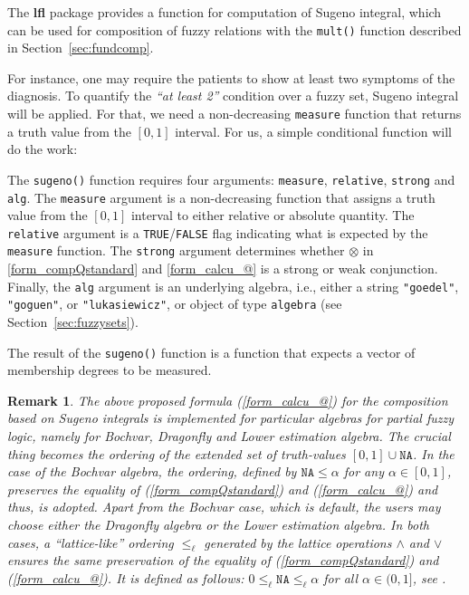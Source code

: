 \documentclass[review]{elsarticle}
\newcommand{\pkg}[1]{\textbf{#1}}
\newcommand{\code}[1]{\texttt{#1}}
\newtheorem{rem}{Remark}
\begin{document}
The \pkg{lfl} package provides a function for computation of Sugeno integral, which can be used for composition of fuzzy relations with the \code{mult()} function described in Section~\ref{sec:fundcomp}.

For instance, one may require the patients to show at least two symptoms of the diagnosis. To quantify the \emph{``at least 2''} condition over a fuzzy set, Sugeno integral will be applied. For that, we need a non-decreasing \code{measure} function that returns a truth value from the $[0,1]$ interval. For us, a simple conditional function will do the work:
%


The \code{sugeno()} function requires four arguments: \code{measure}, \code{relative}, \code{strong} and \code{alg}. The \code{measure} argument is a non-decreasing  function that assigns a truth value from the $[0, 1]$ interval to either relative or absolute quantity. The \code{relative} argument is a \code{TRUE}/\code{FALSE} flag indicating what is expected by the \code{measure} function. The \code{strong} argument determines whether $\otimes$ in \eqref{form_compQstandard} and \eqref{form_calcu_@} is a strong or weak conjunction. Finally, the \code{alg} argument is an underlying algebra, i.e., either a string \code{"goedel"}, \code{"goguen"}, or \code{"lukasiewicz"}, or object of type \code{algebra} (see Section~\ref{sec:fuzzysets}).

The result of the \code{sugeno()} function is a function that expects a vector of membership degrees to be measured.


\begin{rem}
The above proposed formula (\ref{form_calcu_@}) for  the composition based on Sugeno integrals is implemented for particular algebras for partial fuzzy logic, namely for Bochvar, Dragonfly and Lower estimation algebra. The crucial thing becomes the ordering of the extended set of truth-values $[0,1]\cup \texttt{NA}$. In the case of the Bochvar algebra, the ordering, defined by $\texttt{NA} \le \alpha$ for any $\alpha \in [0,1]$, preserves the equality of (\ref{form_compQstandard}) and (\ref{form_calcu_@}) and thus, is adopted. Apart from the Bochvar case, which is default, the users may choose either the Dragonfly algebra or the Lower estimation algebra. In both cases, a 
 ``lattice-like'' ordering  $ \leq_{\ell} $ generated by the  lattice operations $\wedge$ and $\vee$ ensures the same preservation of the  equality of  (\ref{form_compQstandard}) and (\ref{form_calcu_@}). It is defined as follows: $0 \leq_{\ell} \texttt{NA} \leq_{\ell} \alpha$ for all $ \alpha\in (0, 1] $, see  \cite{Step_etal_Dragon_IJAR2019}. 
\end{rem}
\end{document}
